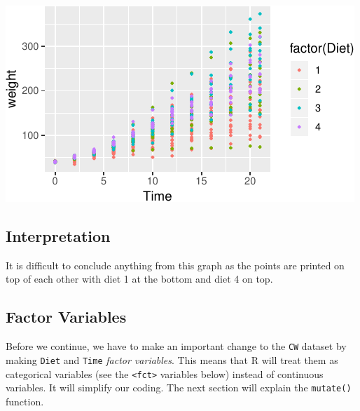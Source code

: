 \documentclass[a4paper,9pt,twocolumn,twoside,printwatermark=false]{pinp}
\begin{document}
\begin{center}\includegraphics{Getting-Started-in-R_files/figure-latex/addColourPlot-1} \end{center}

\subsection{Interpretation}\label{interpretation-1}

It is difficult to conclude anything from this graph as the points are
printed on top of each other with diet 1 at the bottom and diet 4 on
top.

\subsection{Factor Variables}\label{factor-variables}

Before we continue, we have to make an important change to the
\texttt{CW} dataset by making \texttt{Diet} and \texttt{Time}
\emph{factor variables}. This means that R will treat them as
categorical variables (see the \texttt{\textless{}fct\textgreater{}}
variables below) instead of continuous variables. It will simplify our
coding. The next section will explain the \texttt{mutate()} function.

\begin{Shaded}
\begin{Highlighting}[]
\StringTok{ } 
\StringTok{ } 
\end{Highlighting}
\end{Shaded}
\end{document}
